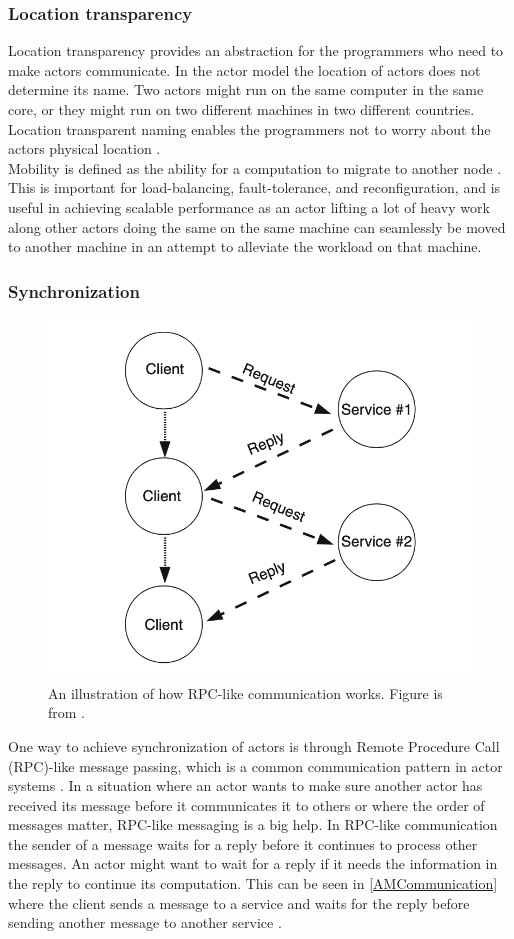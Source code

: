 \subsubsection{Location transparency}
Location transparency provides an abstraction for the programmers who need to make actors communicate. In the actor model the location of actors does not determine its name. Two actors might run on the same computer in the same core, or they might run on two different machines in two different countries. Location transparent naming enables the programmers not to worry about the actors physical location \cite{ActorModelPaper}.\\
Mobility is defined as the ability for a computation to migrate to another node \cite{ActorModelPaper}. This is important for load-balancing, fault-tolerance, and reconfiguration, and is useful in achieving scalable performance \cite{ActorModelPaper} as an actor lifting a lot of heavy work along other actors doing the same on the same machine can seamlessly be moved to another machine in an attempt to alleviate the workload on that machine.

\subsubsection{Synchronization} \label{Synchronization}
\begin{figure}[H]
	\centering
	\includegraphics[width=0.6\linewidth]{Materials/ActorModel/AMCommunication}
	\caption{An illustration of how RPC-like communication works. Figure is from \cite{ActorModelPaper}.}
	\label{AMCommunication}
\end{figure}
One way to achieve synchronization of actors is through Remote Procedure Call (RPC)-like message passing, which is a common communication pattern in actor systems \cite{ActorModelPaper}. In a situation where an actor wants to make sure another actor has received its message before it communicates it to others or where the order of messages matter, RPC-like messaging is a big help. In RPC-like communication the sender of a message waits for a reply before it continues to process other messages. An actor might want to wait for a reply if it needs the information in the reply to continue its computation. This can be seen in \autoref{AMCommunication} where the client sends a message to a service and waits for the reply before sending another message to another service \cite{ActorModelPaper}.\\
